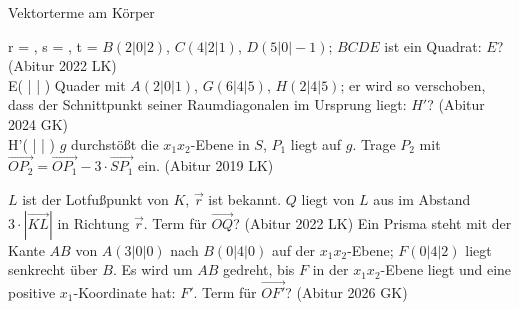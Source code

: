 \begin{aufgabe}{Vektorterme am Körper}
\begin{teile}
\begin{ksys3}[x1max=7]             \end{ksys3}
r = \leerfeld , s = \leerfeld , t = \leerfeld
\teil $B(2 | 0 | 2)$, $C(4 | 2 | 1)$, $D(5 | 0 | -1)$; $BCDE$ ist ein Quadrat: $E$? \hfill (Abitur 2022 LK) \\ E( \leerfeld | \leerfeld | \leerfeld )
\teil Quader mit $A(2 | 0 | 1)$, $G(6 | 4 | 5)$, $H(2 | 4 | 5)$; er wird so verschoben, dass der Schnittpunkt seiner Raumdiagonalen im Ursprung liegt: $H'$? \hfill (Abitur 2024 GK) \\ H'( \leerfeld | \leerfeld | \leerfeld )
\teil $g$ durchstößt die $x_1x_2$-Ebene in $S$, $P_1$ liegt auf $g$. Trage $P_2$ mit $\overrightarrow{OP_2} = \overrightarrow{OP_1} - 3 \cdot \overrightarrow{SP_1}$ ein. \hfill (Abitur 2019 LK)

\begin{ksys3}[x3min=-3]      \end{ksys3}
\teil $L$ ist der Lotfußpunkt von $K$, $\vec r$ ist bekannt. $Q$ liegt von $L$ aus im Abstand $3 \cdot |\overrightarrow{KL}|$ in Richtung $\vec r$. Term für $\overrightarrow{OQ}$? \hfill (Abitur 2022 LK)
\teil Ein Prisma steht mit der Kante $AB$ von $A(3 | 0 | 0)$ nach $B(0 | 4 | 0)$ auf der $x_1x_2$-Ebene; $F(0 | 4 | 2)$ liegt senkrecht über $B$. Es wird um $AB$ gedreht, bis $F$ in der $x_1x_2$-Ebene liegt und eine positive $x_1$-Koordinate hat: $F'$. Term für $\overrightarrow{OF'}$? \hfill (Abitur 2026 GK)
\end{teile}
\end{aufgabe}

